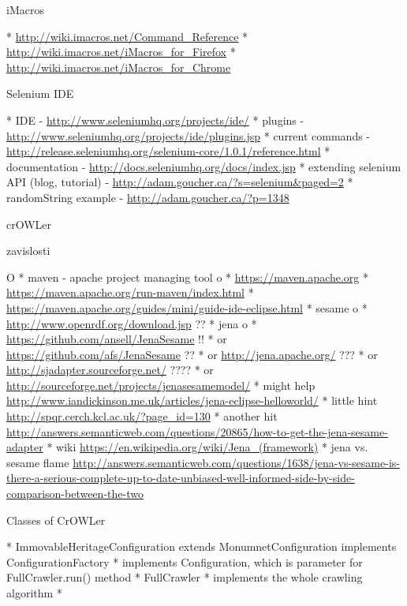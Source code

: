 \secc iMacros

\begitems
  * \url{http://wiki.imacros.net/Command_Reference}
  * \url{http://wiki.imacros.net/iMacros_for_Firefox}
  * \url{http://wiki.imacros.net/iMacros_for_Chrome}
\enditems


%


\secc Selenium IDE

\begitems
  * IDE - \url{http://www.seleniumhq.org/projects/ide/}
  * plugins - \url{http://www.seleniumhq.org/projects/ide/plugins.jsp}
  * current commands - \url{http://release.seleniumhq.org/selenium-core/1.0.1/reference.html}
  * documentation - \url{http://docs.seleniumhq.org/docs/index.jsp}
  * extending selenium API (blog, tutorial) - \url{http://adam.goucher.ca/?s=selenium&paged=2}
  \begitems
    * randomString example - \url{http://adam.goucher.ca/?p=1348}
  \enditems
\enditems




\sec crOWLer

\secc zavislosti

\begitems \style O
  * maven - apache project managing tool
  \begitems \style o
    * \url{https://maven.apache.org}
    * \url{https://maven.apache.org/run-maven/index.html}
    * \url{https://maven.apache.org/guides/mini/guide-ide-eclipse.html}
  \enditems
  * sesame
  \begitems \style o
    * \url{http://www.openrdf.org/download.jsp} ??
  \enditems
  * jena
  \begitems \style o
    * \url{https://github.com/ansell/JenaSesame} !!
    * or \url{https://github.com/afs/JenaSesame} ??
    * or \url{http://jena.apache.org/} ???
    * or \url{http://sjadapter.sourceforge.net/} ????
    * or \url{http://sourceforge.net/projects/jenasesamemodel/}
    * might help \url{http://www.iandickinson.me.uk/articles/jena-eclipse-helloworld/}
    * little hint \url{http://spqr.cerch.kcl.ac.uk/?page_id=130}
    * another hit \url{http://answers.semanticweb.com/questions/20865/how-to-get-the-jena-sesame-adapter}
    * wiki \url{https://en.wikipedia.org/wiki/Jena_(framework)}
    * jena vs. sesame flame \url{http://answers.semanticweb.com/questions/1638/jena-vs-sesame-is-there-a-serious-complete-up-to-date-unbiased-well-informed-side-by-side-comparison-between-the-two}
  \enditems
\enditems


\secc Classes of CrOWLer

\begitems
  * ImmovableHeritageConfiguration extends MonumnetConfiguration implements ConfigurationFactory 
  \begitems
    * implements Configuration, which is parameter for FullCrawler.run() method
  \enditems
  * FullCrawler
  \begitems
    * implements the whole crawling algorithm
    * 
  \enditems
\enditems

